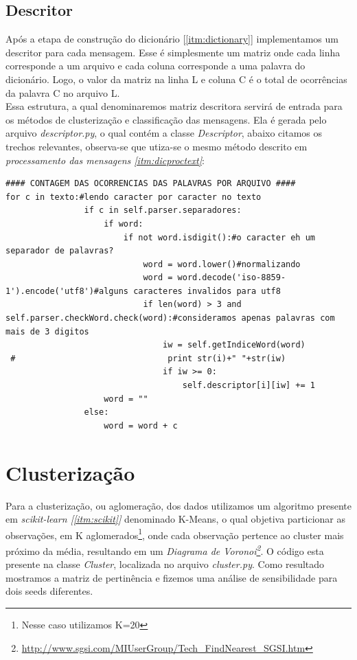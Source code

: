 \documentclass[a4paper,10pt]{article}
\begin{document}
\subsection{Descritor}\label{itm:descriptor}
Após a etapa de construção do dicionário [\ref{itm:dictionary}] implementamos um descritor
para cada mensagem. Esse é simplesmente um matriz onde cada linha corresponde a um arquivo e 
cada coluna corresponde a uma palavra do dicionário. Logo, o valor da matriz na linha L e coluna C é o total de ocorrências da palavra C no arquivo L.\\
Essa estrutura, a qual denominaremos matriz descritora servirá de entrada para os métodos de clusterização e classificação das mensagens. Ela é gerada pelo arquivo \emph{descriptor.py}, o qual contém a classe \emph{Descriptor}, abaixo citamos os trechos relevantes, observa-se que utiza-se o mesmo método descrito em \emph{processamento das mensagens \ref{itm:dicproctext}}:
\begin{lstlisting}
#### CONTAGEM DAS OCORRENCIAS DAS PALAVRAS POR ARQUIVO ####
for c in texto:#lendo caracter por caracter no texto
                if c in self.parser.separadores: 
                    if word:
                        if not word.isdigit():#o caracter eh um separador de palavras? 
                            word = word.lower()#normalizando
                            word = word.decode('iso-8859-1').encode('utf8')#alguns caracteres invalidos para utf8
                            if len(word) > 3 and self.parser.checkWord.check(word):#consideramos apenas palavras com mais de 3 digitos 
                                iw = self.getIndiceWord(word)
 #                               print str(i)+" "+str(iw)
                                if iw >= 0:
                                    self.descriptor[i][iw] += 1
                    word = ""
                else:
                    word = word + c

\end{lstlisting}
\section{Clusterização}\label{itm:cluster}
Para a clusterização, ou aglomeração, dos dados utilizamos um algoritmo presente em \emph{scikit-learn [\ref{itm:scikit}]} denominado K-Means, o qual objetiva particionar as observações, em K aglomerados\footnote{Nesse caso utilizamos K=20}, onde cada observação pertence ao cluster mais próximo da média, resultando em um \emph{Diagrama de Voronoi\footnote{\url{http://www.sgsi.com/MIUserGroup/Tech_FindNearest_SGSI.htm}}}. O código esta presente na classe \emph{Cluster}, localizada no arquivo \emph{cluster.py}. Como resultado mostramos a matriz de pertinência e fizemos uma análise de sensibilidade para dois seeds diferentes.

\end{document}
